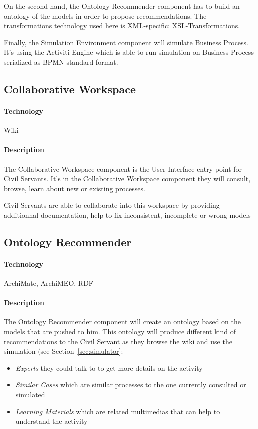 \documentclass{learnpad}
\begin{document}
On the second hand, the Ontology Recommender component has to build an ontology
of the models in order to propose recommendations.  The transformations
technology used here is XML-specific: XSL-Transformations.

Finally, the Simulation Environment component will simulate Business Process.
It's using the Activiti Engine which is able to run simulation on Business
Process serialized as BPMN standard format.

\subsection{Collaborative Workspace}
\label{sec:collaborative-workspace}

\paragraph{Technology}
Wiki

\paragraph{Description}
The Collaborative Workspace component is the User Interface entry point for
Civil Servants.  It's in the Collaborative Workspace component they will
consult, browse, learn about new or existing processes.

Civil Servants are able to collaborate into this workspace by providing
additionnal documentation, help to fix inconsistent, incomplete or wrong models

\subsection{Ontology Recommender}
\label{sec:ontology-recommender}

\paragraph{Technology}
ArchiMate, ArchiMEO, RDF

\paragraph{Description}
The Ontology Recommender component will create an ontology based on the models
that are pushed to him.  This ontology will produce different kind of
recommendations to the Civil Servant as they browse the wiki and use the
simulation (see Section~\ref{sec:simulator}:
\begin{itemize}
	\item \emph{Experts} they could talk to to get more details on the activity
	\item \emph{Similar Cases} which are similar processes to the one currently
		consulted or simulated
	\item \emph{Learning Materials} which are related
		multimedias that can help to understand the activity
\end{itemize}
\end{document}
